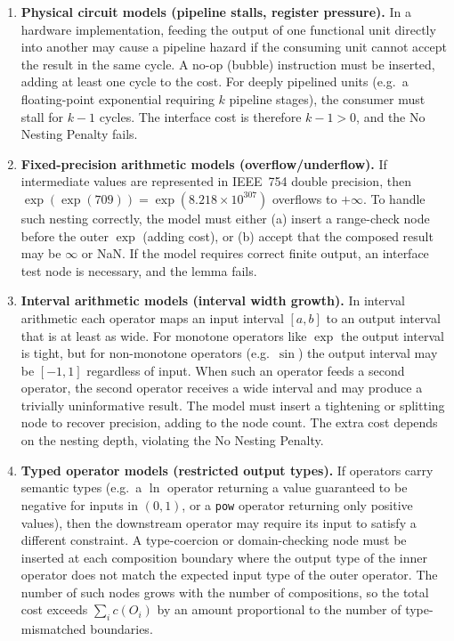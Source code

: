 \documentclass[12pt,a4paper]{article}
\theoremstyle{definition}
\newcommand{\uc}[1]{c(#1)}   %
\begin{document}
\begin{enumerate}
  \item \textbf{Physical circuit models (pipeline stalls, register pressure).}
        In a hardware implementation, feeding the output of one functional
        unit directly into another may cause a pipeline hazard if the
        consuming unit cannot accept the result in the same cycle.  A
        no-op (bubble) instruction must be inserted, adding at least one
        cycle to the cost.  For deeply pipelined units (e.g.\ a
        floating-point exponential requiring $k$ pipeline stages), the
        consumer must stall for $k - 1$ cycles.  The interface cost is
        therefore $k - 1 > 0$, and the No Nesting Penalty fails.

  \item \textbf{Fixed-precision arithmetic models (overflow/underflow).}
        If intermediate values are represented in IEEE~754 double
        precision, then $\exp(\exp(709)) = \exp(8.218 \times 10^{307})$
        overflows to $+\infty$.  To handle such nesting correctly, the
        model must either (a) insert a range-check node before the outer
        $\exp$ (adding cost), or (b) accept that the composed result may
        be $\infty$ or NaN.  If the model requires correct finite output,
        an interface test node is necessary, and the lemma fails.

  \item \textbf{Interval arithmetic models (interval width growth).}
        In interval arithmetic each operator maps an input interval
        $[a, b]$ to an output interval that is at least as wide.  For
        monotone operators like $\exp$ the output interval is tight, but
        for non-monotone operators (e.g.\ $\sin$) the output interval may
        be $[-1, 1]$ regardless of input.  When such an operator feeds a
        second operator, the second operator receives a wide interval and
        may produce a trivially uninformative result.  The model must
        insert a tightening or splitting node to recover precision, adding
        to the node count.  The extra cost depends on the nesting depth,
        violating the No Nesting Penalty.

  \item \textbf{Typed operator models (restricted output types).}
        If operators carry semantic types (e.g.\ a $\ln$ operator
        returning a value guaranteed to be negative for inputs in $(0,1)$,
        or a \texttt{pow} operator returning only positive values), then
        the downstream operator may require its input to satisfy a
        different constraint.  A type-coercion or domain-checking node
        must be inserted at each composition boundary where the output
        type of the inner operator does not match the expected input type
        of the outer operator.  The number of such nodes grows with the
        number of compositions, so the total cost exceeds
        $\sum_i \uc{O_i}$ by an amount proportional to the number of
        type-mismatched boundaries.
\end{enumerate}
\end{document}
